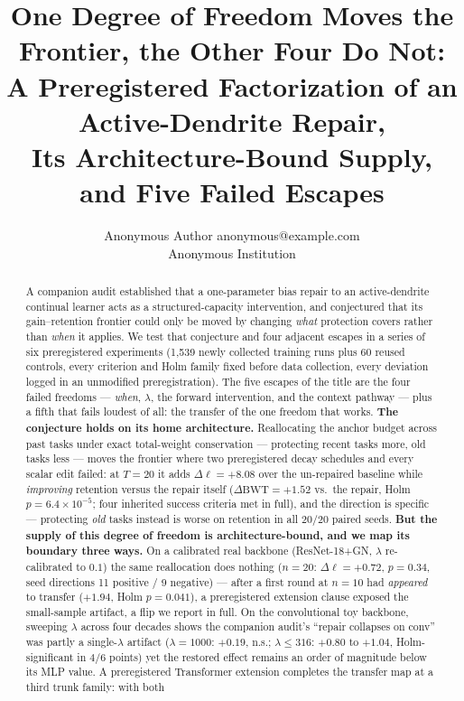 \documentclass[10pt]{article}
\title{One Degree of Freedom Moves the Frontier, the Other Four Do Not:\\
A Preregistered Factorization of an Active-Dendrite Repair,\\
Its Architecture-Bound Supply, and Five Failed Escapes}
\author{\name Anonymous Author \email anonymous@example.com \\ \addr Anonymous Institution}
\newcommand{\gain}{\Delta\ell}
\newcommand{\dbwt}{\Delta\mathrm{BWT}}
\begin{document}
\maketitle

\begin{abstract}
A companion audit established that a one-parameter bias repair to an
active-dendrite continual learner acts as a structured-capacity intervention,
and conjectured that its gain--retention frontier could only be moved by
changing \emph{what} protection covers rather than \emph{when} it applies. We
test that conjecture and four adjacent escapes in a series of six
preregistered experiments (1{,}539 newly collected training runs plus $60$
reused controls, every criterion and Holm family
fixed before data collection, every deviation logged in an unmodified
preregistration). The five escapes of the title are the four failed
freedoms --- \emph{when}, $\lambda$, the forward intervention, and the
context pathway --- plus a fifth that fails loudest of all: the transfer
of the one freedom that works. \textbf{The conjecture holds on its home
architecture.}
Reallocating the anchor budget across past tasks under exact total-weight
conservation --- protecting recent tasks more, old tasks less --- moves the
frontier where two preregistered decay schedules and every scalar edit
failed: at $T{=}20$ it adds $\gain=+8.08$ over the un-repaired baseline while
\emph{improving} retention versus the repair itself
($\dbwt=+1.52$ vs.\ the repair, Holm $p=6.4\times10^{-5}$; four inherited
success criteria met in full), and the direction is specific --- protecting
\emph{old} tasks instead is worse on retention in all $20/20$
paired seeds. \textbf{But the supply of this degree of freedom is
architecture-bound, and we map its boundary three ways.} On a
calibrated real backbone (ResNet-18+GN, $\lambda$ re-calibrated to $0.1$) the
same reallocation does nothing ($n{=}20$: $\gain=+0.72$, $p=0.34$, seed
directions 11 positive / 9 negative) --- after a first round at $n{=}10$ had \emph{appeared} to
transfer ($+1.94$, Holm $p=0.041$), a preregistered extension clause exposed
the small-sample artifact, a flip we report in full. On the convolutional
toy backbone, sweeping $\lambda$ across four decades shows the companion
audit's ``repair collapses on conv'' was partly a single-$\lambda$ artifact
($\lambda{=}1000$: $+0.19$, n.s.; $\lambda\le316$: $+0.80$ to $+1.04$,
Holm-significant in $4/6$ points) yet the restored effect remains an order of
magnitude below its MLP value. A preregistered Transformer extension
completes the transfer map at a third trunk family: with both

\end{abstract}
\end{document}
